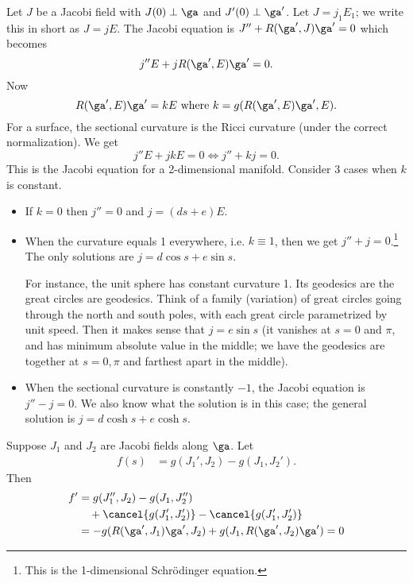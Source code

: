 
Let $J$ be a Jacobi field with $J(0)\perp \ga$ and $J'(0)\perp \ga'$. Let $J=j_1E_1$; we write this in short as $J=jE$. The Jacobi equation is $J''+R(\ga',J)\ga'=0$ which becomes
\[
j''E+jR(\ga',E)\ga'=0.
\]
Now 
\[R(\ga',E)\ga'=kE\text{ where }
k=g(R(\ga',E)\ga',E).
\]
For a surface, the sectional curvature is the Ricci curvature (under the correct normalization). We get
\[
j''E+jk E=0\iff j''+kj=0.
\]
This is the Jacobi equation for a 2-dimensional manifold. 
Consider 3 cases when $k$ is constant.
\begin{itemize}
\item
If $k=0$ then $j''=0$ %
and $j=(ds+e)E$.
\item
When the curvature equals 1 everywhere, i.e. $k\equiv1$, then we get $j''+j=0$.\footnote{This is the 1-dimensional Schr\"odinger equation.} The only solutions are $j=d\cos s+e\sin s$. 



For instance, the unit sphere has constant curvature 1. 
Its geodesics are the great circles are geodesics. Think of a family (variation) of great circles going through the north and south poles, with each great circle parametrized by unit speed. Then it makes sense that $j=e\sin s$ (it vanishes at $s=0$ and $\pi$, and has minimum absolute value in the middle; we have the geodesics are together at $s=0,\pi$ and farthest apart in the middle). %
\item
When the sectional curvature is constantly $-1$, the Jacobi equation is $j''-j=0$. We also know what the solution is in this case; the general solution is $j=d\cosh s+e\cosh s$. 
\end{itemize}

Suppose $J_1$ and $J_2$ are Jacobi fields along $\ga$. Let
\begin{align*} 
f(s)&=g(J_1',J_2)-g(J_1,J_2').
\end{align*}
Then
\begin{align*} 
f'&=g(J_1'',J_2)-g(J_1,J_2'')\\
&\quad+\cancel{g(J_1',J_2')}-\cancel{g(J_1',J_2')}\\
&=-g(R(\ga',J_1) \ga',J_2)+g(J_1,R(\ga',J_2)\ga')=0
\end{align*}
%

